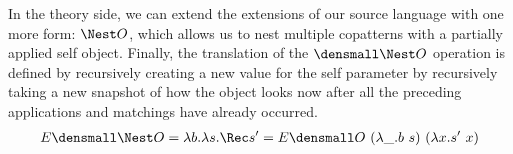 In the theory side, we can extend the extensions of our source language with one more form: $\Nest O$, which allows us to nest multiple copatterns with a partially applied self object. 
Finally, the translation of the $\den{\Nest O}$ operation is defined by recursively creating a new value for the self parameter by recursively taking a new snapshot of how the object looks now after all the preceding applications and matchings have already occurred.
\begin{align*}
  E\den{\Nest O}
  &=
  \lambda b. \lambda s. \Rec s' = E\den{O} ~ (\lambda \_. b ~ s) ~ (\lambda x. s' ~ x)
  \\
\end{align*}


